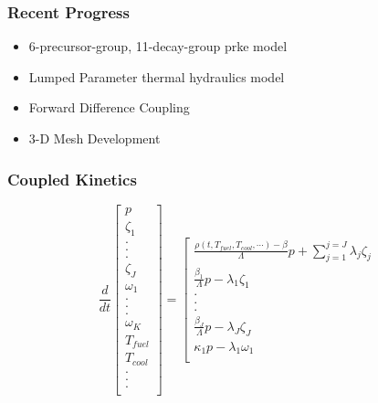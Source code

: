 

\begin{frame}[fragile]
  \frametitle{Recent Progress}
  \begin{itemize}
    \item 6-precursor-group, 11-decay-group prke model
    \item Lumped Parameter thermal hydraulics model
    \item Forward Difference Coupling 
    \item 3-D Mesh Development
  \end{itemize}
\end{frame}

\begin{frame}[fragile]
  \frametitle{Coupled Kinetics}
  \footnotesize{
\begin{equation} 
  \frac{d}{dt}\left[
    \begin{array}{c}
      p\\
      \zeta_1\\
      .\\
      .\\
      .\\
      \zeta_J\\
      \omega_1\\
      .\\
      .\\
      .\\
      \omega_K\\
      T_{fuel}\\
      T_{cool}\\
      .\\
      .\\
      .\\
    \end{array}
    \right]
    =
    \left[
      \begin{array}{ c }
        \frac{\rho(t,T_{fuel},T_{cool},\cdots)-\beta}{\Lambda}p + 
        \displaystyle\sum^{j=J}_{j=1}\lambda_j\zeta_j\\
        \frac{\beta_1}{\Lambda} p - \lambda_1\zeta_1\\
        .\\
        .\\
        .\\
        \frac{\beta_J}{\Lambda}p-\lambda_J\zeta_J\\
        \kappa_1p - \lambda_1\omega_1\\

\end{array}
\end{equation}}
\end{frame}
